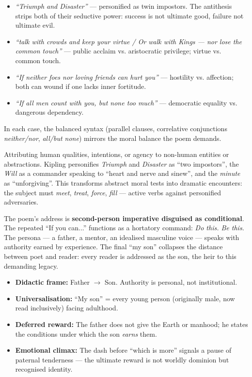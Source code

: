 \documentclass[11pt]{article}
\begin{document}
\begin{exemplebox}[Antithesis in 'If']
\begin{itemize}
\item \emph{``Triumph and Disaster''} — personified as twin impostors. The antithesis strips both of their seductive power: success is not ultimate good, failure not ultimate evil.
\item \emph{``talk with crowds and keep your virtue / Or walk with Kings — nor lose the common touch''} — public acclaim vs. aristocratic privilege; virtue vs. common touch.
\item \emph{``If neither foes nor loving friends can hurt you''} — hostility vs. affection; both can wound if one lacks inner fortitude.
\item \emph{``If all men count with you, but none too much''} — democratic equality vs. dangerous dependency.
\end{itemize}
In each case, the balanced syntax (parallel clauses, correlative conjunctions \emph{neither/nor}, \emph{all/but none}) mirrors the moral balance the poem demands.
\end{exemplebox}

\begin{definition}[Personification]
Attributing human qualities, intentions, or agency to non-human entities or abstractions. Kipling personifies \emph{Triumph} and \emph{Disaster} as ``two impostors'', the \emph{Will} as a commander speaking to ``heart and nerve and sinew'', and the \emph{minute} as ``unforgiving''. This transforms abstract moral tests into dramatic encounters: the subject must \emph{meet}, \emph{treat}, \emph{force}, \emph{fill} — active verbs against personified adversaries.
\end{definition}

The poem's address is \textbf{second-person imperative disguised as conditional}. The repeated ``If you can...'' functions as a hortatory command: \emph{Do this. Be this.} The persona — a father, a mentor, an idealised masculine voice — speaks with authority earned by experience. The final ``my son'' collapses the distance between poet and reader: every reader is addressed as the son, the heir to this demanding legacy.

\begin{aretenir}
\begin{itemize}
\item \textbf{Didactic frame:} Father $\rightarrow$ Son. Authority is personal, not institutional.
\item \textbf{Universalisation:} ``My son'' = every young person (originally male, now read inclusively) facing adulthood.
\item \textbf{Deferred reward:} The father does not give the Earth or manhood; he states the conditions under which the son \emph{earns} them.
\item \textbf{Emotional climax:} The dash before ``which is more'' signals a pause of paternal tenderness — the ultimate reward is not worldly dominion but recognised identity.
\end{itemize}
\end{aretenir}
\end{document}
